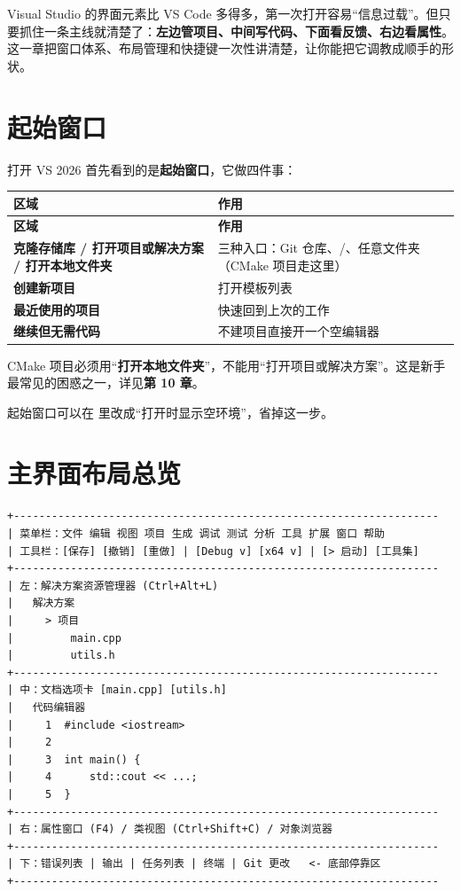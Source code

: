 
Visual Studio 的界面元素比 VS Code 多得多，第一次打开容易“信息过载”。但只要抓住一条主线就清楚了：\textbf{左边管项目、中间写代码、下面看反馈、右边看属性}。这一章把窗口体系、布局管理和快捷键一次性讲清楚，让你能把它调教成顺手的形状。

\section{起始窗口}

打开 VS 2026 首先看到的是\textbf{起始窗口}，它做四件事：

\begin{longtable}{L{6.0cm}L{9.0cm}}\toprule
\textbf{区域} & \textbf{作用} \\ \midrule \endfirsthead
\toprule \textbf{区域} & \textbf{作用} \\ \midrule \endhead
\bottomrule \endlastfoot
\textbf{克隆存储库 / 打开项目或解决方案 / 打开本地文件夹} & 三种入口：Git 仓库、/、任意文件夹（CMake 项目走这里） \\
\textbf{创建新项目} & 打开模板列表 \\
\textbf{最近使用的项目} & 快速回到上次的工作 \\
\textbf{继续但无需代码} & 不建项目直接开一个空编辑器 \\
\end{longtable}

\begin{tipbox}[提示]
CMake 项目必须用“\textbf{打开本地文件夹}”，不能用“打开项目或解决方案”。这是新手最常见的困惑之一，详见\textbf{第 10 章}。
\end{tipbox}

起始窗口可以在  里改成“打开时显示空环境”，省掉这一步。

\section{主界面布局总览}

\begin{lstlisting}[style=textstyle]
+-------------------------------------------------------------------
| 菜单栏：文件 编辑 视图 项目 生成 调试 测试 分析 工具 扩展 窗口 帮助
| 工具栏：[保存] [撤销] [重做] | [Debug v] [x64 v] | [> 启动] [工具集]
+-------------------------------------------------------------------
| 左：解决方案资源管理器 (Ctrl+Alt+L)
|   解决方案
|     > 项目
|         main.cpp
|         utils.h
+-------------------------------------------------------------------
| 中：文档选项卡 [main.cpp] [utils.h]
|   代码编辑器
|     1  #include <iostream>
|     2
|     3  int main() {
|     4      std::cout << ...;
|     5  }
+-------------------------------------------------------------------
| 右：属性窗口 (F4) / 类视图 (Ctrl+Shift+C) / 对象浏览器
+-------------------------------------------------------------------
| 下：错误列表 | 输出 | 任务列表 | 终端 | Git 更改   <- 底部停靠区
+-------------------------------------------------------------------
\end{lstlisting}

